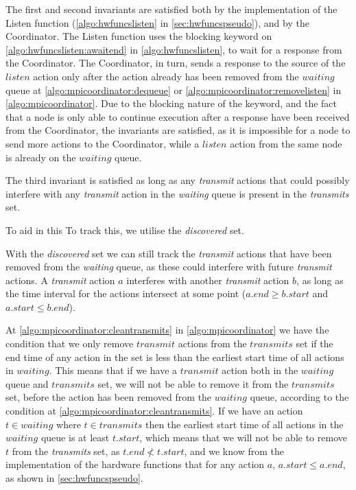 The first and second invariants are satisfied both by the implementation of the Listen function 
(\autoref{algo:hwfuncslisten} in \autoref{sec:hwfuncspseudo}), and by the Coordinator. The Listen function 
uses the blocking \KwAwait keyword on \autoref{algo:hwfuncslisten:awaitend} in \autoref{algo:hwfuncslisten}, 
to wait for a response from the Coordinator. The Coordinator, in turn, sends a response to the source of the 
$listen$ action only after the action already has been removed from the $waiting$ queue at 
\autoref{algo:mpicoordinator:dequeue} or \autoref{algo:mpicoordinator:removelisten} in 
\autoref{algo:mpicoordinator}. Due to the blocking nature of the \KwAwait keyword, and the fact that a node 
is only able to continue execution after a response have been received from the Coordinator, the invariants 
are satisfied, as it is impossible for a node to send more actions to the Coordinator, while a $listen$ 
action from the same node is already on the $waiting$ queue. 
\smallbreak

The third invariant is satisfied as long as any \textit{transmit} actions that could possibly interfere with 
any \textit{transmit} action in the \textit{waiting} queue is present in the \textit{transmits} set. 

To aid in this
To track this, we utilise the \textit{discovered} set. 

With the \textit{discovered} set we can still track the
\textit{transmit} actions that have been removed from the \textit{waiting} queue, as these could interfere 
with future \textit{transmit} actions. A \textit{transmit} action $a$ interferes with another 
\textit{transmit} action $b$, as long as the time interval for the actions intersect at some point  
($a.\mathit{end} \geq b.\mathit{start}$ and $a.\mathit{start} \leq b.\mathit{end}$). 


At \autoref{algo:mpicoordinator:cleantransmits}
in \autoref{algo:mpicoordinator} we have the condition that we only remove $\mathit{transmit}$ actions from 
the $\mathit{transmits}$ set if the end time of any action in the set is less than the earliest start time of 
all actions in $\mathit{waiting}$. This means that if we have a $\mathit{transmit}$ action both in the 
$\mathit{waiting}$ queue and $\mathit{transmits}$ set, we will not be able to remove it from the 
$\mathit{transmits}$ set, before the action has been removed from the $\mathit{waiting}$ queue, according to 
the condition at \autoref{algo:mpicoordinator:cleantransmits}. If we have an action $t \in \mathit{waiting}$ 
where $t \in \mathit{transmits}$ then the earliest start time of all actions in the $\mathit{waiting}$ queue 
is at least $t.\mathit{start}$, which means that we will not be able to remove $t$ from the \textit{transmits} 
set, as $t.\mathit{end} \nless t.\mathit{start}$, and we know from the implementation of the hardware 
functions that for any action $a$, $a.\mathit{start} \leq a.\mathit{end}$, 
as shown in \autoref{sec:hwfuncspseudo}.

